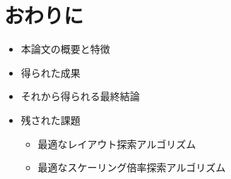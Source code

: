 \chapter{おわりに}
\begin{itemize}
\item 本論文の概要と特徴
\item 得られた成果
\item それから得られる最終結論
\item 残された課題
    \begin{itemize}
        \item 最適なレイアウト探索アルゴリズム
        \item 最適なスケーリング倍率探索アルゴリズム
    \end{itemize}
\end{itemize}
